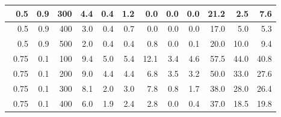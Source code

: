 \begin{longtable}{|r|r|r|r|r|r|r|r|r|r|r|r|}
        \hline \
        0.5                            & 0.9                     & 300                       & 4.4                       & 0.4                       & 1.2                       & 0.0                       & 0.0                       & 0.0                       & 21.2                      & 2.5                      & 7.6                       \\
        \hline \
        0.5                           & 0.9                     & 400                       & 3.0                       & 0.4                       & 0.7                       & 0.0                      & 0.0                       & 0.0                       & 17.0                      & 5.0                      & 5.3                      \\
        \hline \
        0.5                           & 0.9                     & 500                       & 2.0                       & 0.4                       & 0.4                       & 0.8                       & 0.0                       & 0.1                       & 20.0                      & 10.0                      & 9.4                      \\
        \hline \
        0.75                           & 0.1                     & 100                       & 9.4                       & 5.0                       & 5.4                       & 12.1                       & 3.4                       & 4.6                       & 57.5                      & 44.0                      & 40.8                      \\
        \hline \
        0.75                           & 0.1                     & 200                       & 9.0                       & 4.4                       & 4.4                       & 6.8                       & 3.5                       & 3.2                       & 50.0                      & 33.0                      & 27.6                      \\
        \hline \
        0.75                           & 0.1                     & 300                       & 8.1                       & 2.0                       & 3.0                       & 7.8                       & 0.8                       & 1.7                       & 38.0                      & 28.0                      & 26.4                      \\
        \hline \
        0.75                           & 0.1                    & 400                       & 6.0                      & 1.9                       & 2.4                       & 2.8                      & 0.0                       & 0.4                       & 37.0                      & 18.5                      & 19.8                      \\

\end{longtable}
